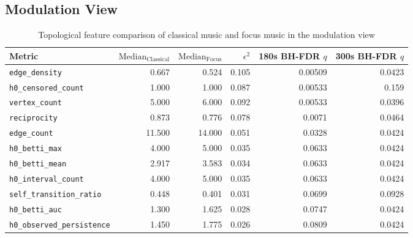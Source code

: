 \documentclass{article}
\begin{document}
\clearpage
\subsection{Modulation View}

\begin{table}[htbp]
\centering
\caption{Topological feature comparison of classical music and focus music in the modulation view}
\label{tab:modulation_topology}
\renewcommand{\arraystretch}{1.5}
\begin{tabular}{lrrrrr}
\toprule
Metric                    & $\text{Median}_{\text{Classical}}$ & $\text{Median}_{\text{Focus}}$ & $\epsilon^2$ & 180s BH-FDR $q$ & 300s BH-FDR $q$ \\
\midrule
\rowcolor{green!15}\verb|edge_density|            &            0.667 &             0.524 &        0.105 &    0.00509 &    0.0423 \\
\rowcolor{orange!15}\verb|h0_censored_count|       &            1.000 &             1.000 &        0.087 &    0.00533 &     0.159 \\
\rowcolor{green!15}\verb|vertex_count|            &            5.000 &             6.000 &        0.092 &    0.00533 &    0.0396 \\
\rowcolor{green!15}\verb|reciprocity|             &            0.873 &             0.776 &        0.078 &     0.0071 &    0.0464 \\
\rowcolor{green!15}\verb|edge_count|              &           11.500 &            14.000 &        0.051 &    0.0328 &    0.0424 \\
\rowcolor{orange!15}\verb|h0_betti_max|            &            4.000 &             5.000 &        0.035 &    0.0633 &    0.0424 \\
\rowcolor{orange!15}\verb|h0_betti_mean|           &            2.917 &             3.583 &        0.034 &    0.0633 &    0.0424 \\
\rowcolor{orange!15}\verb|h0_interval_count|       &            4.000 &             5.000 &        0.035 &    0.0633 &    0.0424 \\
\verb|self_transition_ratio|   &            0.448 &             0.401 &        0.031 &    0.0699 &    0.0928 \\
\rowcolor{orange!15}\verb|h0_betti_auc|            &            1.300 &             1.625 &        0.028 &    0.0747 &    0.0424 \\
\rowcolor{orange!15}\verb|h0_observed_persistence| &            1.450 &             1.775 &        0.026 &    0.0809 &    0.0424 \\

\end{tabular}
\end{table}
\end{document}
